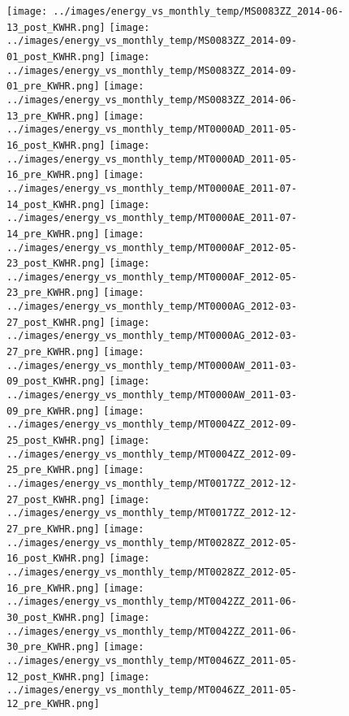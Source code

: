 \clearpage
\begin{figure}
\centering
\texttt{[image: ../images/energy\_vs\_monthly\_temp/MS0083ZZ\_2014-06-13\_post\_KWHR.png]}
\texttt{[image: ../images/energy\_vs\_monthly\_temp/MS0083ZZ\_2014-09-01\_post\_KWHR.png]}
\texttt{[image: ../images/energy\_vs\_monthly\_temp/MS0083ZZ\_2014-09-01\_pre\_KWHR.png]}
\texttt{[image: ../images/energy\_vs\_monthly\_temp/MS0083ZZ\_2014-06-13\_pre\_KWHR.png]}
\texttt{[image: ../images/energy\_vs\_monthly\_temp/MT0000AD\_2011-05-16\_post\_KWHR.png]}
\texttt{[image: ../images/energy\_vs\_monthly\_temp/MT0000AD\_2011-05-16\_pre\_KWHR.png]}
\texttt{[image: ../images/energy\_vs\_monthly\_temp/MT0000AE\_2011-07-14\_post\_KWHR.png]}
\texttt{[image: ../images/energy\_vs\_monthly\_temp/MT0000AE\_2011-07-14\_pre\_KWHR.png]}
\texttt{[image: ../images/energy\_vs\_monthly\_temp/MT0000AF\_2012-05-23\_post\_KWHR.png]}
\texttt{[image: ../images/energy\_vs\_monthly\_temp/MT0000AF\_2012-05-23\_pre\_KWHR.png]}
\texttt{[image: ../images/energy\_vs\_monthly\_temp/MT0000AG\_2012-03-27\_post\_KWHR.png]}
\texttt{[image: ../images/energy\_vs\_monthly\_temp/MT0000AG\_2012-03-27\_pre\_KWHR.png]}
\texttt{[image: ../images/energy\_vs\_monthly\_temp/MT0000AW\_2011-03-09\_post\_KWHR.png]}
\texttt{[image: ../images/energy\_vs\_monthly\_temp/MT0000AW\_2011-03-09\_pre\_KWHR.png]}
\texttt{[image: ../images/energy\_vs\_monthly\_temp/MT0004ZZ\_2012-09-25\_post\_KWHR.png]}
\texttt{[image: ../images/energy\_vs\_monthly\_temp/MT0004ZZ\_2012-09-25\_pre\_KWHR.png]}
\texttt{[image: ../images/energy\_vs\_monthly\_temp/MT0017ZZ\_2012-12-27\_post\_KWHR.png]}
\texttt{[image: ../images/energy\_vs\_monthly\_temp/MT0017ZZ\_2012-12-27\_pre\_KWHR.png]}
\texttt{[image: ../images/energy\_vs\_monthly\_temp/MT0028ZZ\_2012-05-16\_post\_KWHR.png]}
\texttt{[image: ../images/energy\_vs\_monthly\_temp/MT0028ZZ\_2012-05-16\_pre\_KWHR.png]}
\texttt{[image: ../images/energy\_vs\_monthly\_temp/MT0042ZZ\_2011-06-30\_post\_KWHR.png]}
\texttt{[image: ../images/energy\_vs\_monthly\_temp/MT0042ZZ\_2011-06-30\_pre\_KWHR.png]}
\texttt{[image: ../images/energy\_vs\_monthly\_temp/MT0046ZZ\_2011-05-12\_post\_KWHR.png]}
\texttt{[image: ../images/energy\_vs\_monthly\_temp/MT0046ZZ\_2011-05-12\_pre\_KWHR.png]}
\end{figure}

